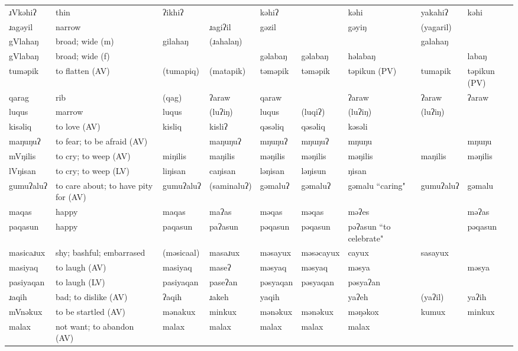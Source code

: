 \begin{landscape}
\begin{longtable}{*{9}{>{\raggedright\arraybackslash}p{}}}
\text{*}ɹVkəhiʔ & thin & ʔikhiʔ &  & kəhiʔ &  & kəhi & yakahiʔ & kəhi\\
\text{*}ɹagəyil & narrow &  & ɹagiʔil & gəzil &  & gəyiŋ & (yagaril) & \\
\text{*}gVlahaŋ & broad; wide (m) & gilahaŋ & (ɹahalaŋ) &  &  &  & galahaŋ & \\
\text{*}gVlabaŋ & broad; wide (f) &  &  & gəlabaŋ & gəlabaŋ & həlabaŋ &  & labaŋ\\
\text{*}tuməpik & to flatten (AV) & (tumapiq) & (matapik) & təməpik & təməpik & təpikun (PV) & tumapik & təpikun (PV)\\
\text{*}qarag & rib & (qag) & ʔaraw & qaraw &  & ʔaraw & ʔaraw & ʔaraw\\
\text{*}luqus & marrow & luqus & (luʔiŋ) & luqus & (luqiʔ) & (luʔiŋ) & (luʔiŋ) & \\
\text{*}kisəliq & to love (AV) & kisliq & kisliʔ & qəsəliq & qəsəliq & kəsəli &  & \\
\text{*}maŋuŋuʔ & to fear; to be afraid (AV) &  & maŋuŋuʔ & mŋuŋuʔ & mŋuŋuʔ & mŋuŋu &  & mŋuŋu\\
\text{*}mVŋilis & to cry; to weep (AV) & miŋilis & maŋilis & məŋilis & məŋilis & məŋilis & maŋilis & məŋilis\\
\text{*}lVŋisan & to cry; to weep (LV) & liŋisan & caŋisan & ləŋisan & ləŋisun & ŋisan &  & \\
\text{*}gumuʔaluʔ & to care about; to have pity for (AV) & gumuʔaluʔ & (saminaluʔ) & gəmaluʔ & gəmaluʔ & gəmalu ``caring" & gumuʔaluʔ & gəmalu\\
\text{*}maqas & happy & maqas & maʔas & məqas & məqas & məʔes &  & məʔas\\
\text{*}paqasun & happy & paqasun & paʔasun & pəqasun & pəqasun & pəʔasun ``to celebrate" &  & pəqasun\\
\text{*}masicaɹux & shy; bashful; embarrased & (məsicaal) & masaɹux & məsayux & məsəcayux & cayux & sasayux & \\
\text{*}masiyaq & to laugh (AV) & masiyaq & maseʔ & məsyaq & məsyaq & məsya &  & məsya\\
\text{*}pasiyaqan & to laugh (LV) & pasiyaqan & paseʔan & pəsyaqan & pəsyaqan & pəsyaʔan &  & \\
\text{*}ɹaqih & bad; to dislike (AV) & ʔaqih & ɹakeh & yaqih &  & yaʔeh & (yaʔil) & yaʔih\\
\text{*}mVnəkux & to be startled (AV) & mənakux & minkux & mənəkux & mənəkux & məŋəkox & kumux & minkux\\
\text{*}malax & not want; to abandon (AV) & malax & malax & malax & malax & malax &  & \\

\end{longtable}
\end{landscape}
